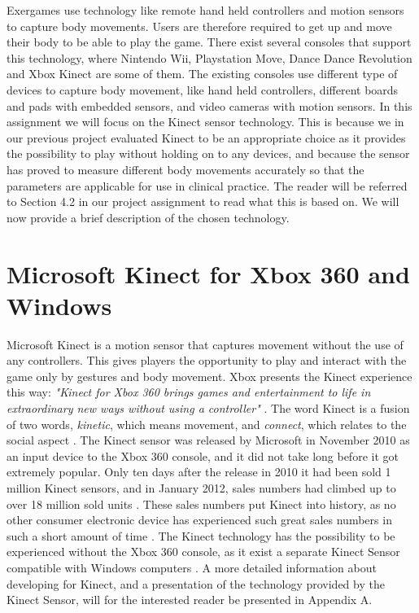 Exergames use technology like remote hand held controllers and motion sensors to capture body movements. Users are therefore required to get up and move their body to be able to play the game. There exist several consoles that support this technology, where Nintendo Wii, Playstation Move, Dance Dance Revolution and Xbox Kinect are some of them. The existing consoles use different type of devices to capture body movement, like hand held controllers, different boards and pads with embedded sensors, and video cameras with motion sensors. In this assignment we will focus on the Kinect sensor technology. This is because we in our previous project evaluated Kinect to be an appropriate choice as it provides the possibility to play without holding on to any devices, and because the sensor has proved to measure different body movements accurately so that the parameters are applicable for use in clinical practice. The reader will be referred to Section 4.2 in our project assignment \cite{project} to read what this is based on. We will now provide a brief description of the chosen technology.

\section{Microsoft Kinect for Xbox 360 and Windows}
\label{sec:xbox}
Microsoft Kinect is a motion sensor that captures movement without the use of any controllers. This gives players the opportunity to play and interact with the game only by gestures and body movement. Xbox presents the Kinect experience this way: \emph{"Kinect for Xbox 360 brings games and entertainment to life in extraordinary new ways without using a controller"} \cite{kinectxboxdef}. The word Kinect is a fusion of two words, \emph{kinetic}, which means movement, and \emph{connect}, which relates to the social aspect \cite{howstuffworksKinect}. The Kinect sensor was released by Microsoft in November 2010 as an input device to the Xbox 360 console, and it did not take long before it got extremely popular. Only ten days after the release in 2010 it had been sold 1 million Kinect sensors, and in January 2012, sales numbers had climbed up to over 18 million sold units \cite{kinectsales}. These sales numbers put Kinect into history, as no other consumer electronic device has experienced such great sales numbers in such a short amount of time  \cite{kinectsales} \cite{microsoftnews}. The Kinect technology has the possibility to be experienced without the Xbox 360 console, as it exist a separate Kinect Sensor compatible with Windows computers \cite{kinectforwindows}. A more detailed information about developing for Kinect, and a presentation of the technology provided by the Kinect Sensor, will for the interested reader be presented in Appendix A.

